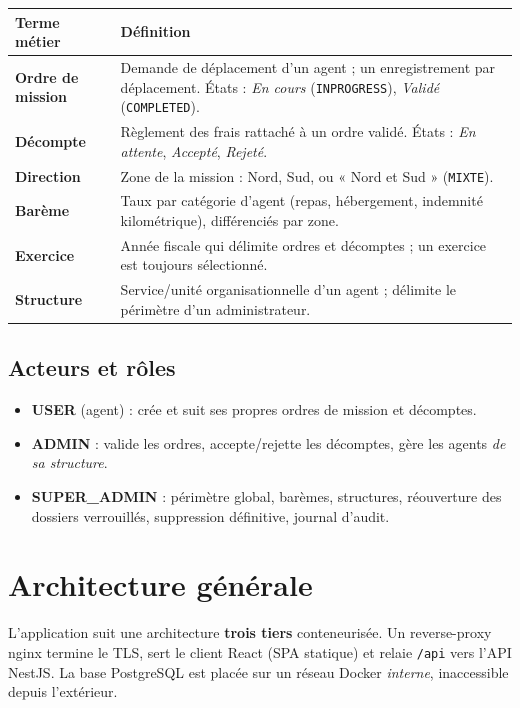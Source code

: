 \documentclass[10.5pt,a4paper]{article}
\newcommand{\code}[1]{\texttt{\small #1}}
\begin{document}
\begin{tabularx}{\textwidth}{@{}>{\bfseries}l X@{}}
\toprule
Terme métier & Définition \\
\midrule
Ordre de mission & Demande de déplacement d'un agent ; un enregistrement par déplacement. États : \emph{En cours} (\code{INPROGRESS}), \emph{Validé} (\code{COMPLETED}). \\
Décompte & Règlement des frais rattaché à un ordre validé. États : \emph{En attente}, \emph{Accepté}, \emph{Rejeté}. \\
Direction & Zone de la mission : Nord, Sud, ou « Nord et Sud » (\code{MIXTE}). \\
Barème & Taux par catégorie d'agent (repas, hébergement, indemnité kilométrique), différenciés par zone. \\
Exercice & Année fiscale qui délimite ordres et décomptes ; un exercice est toujours sélectionné. \\
Structure & Service/unité organisationnelle d'un agent ; délimite le périmètre d'un administrateur. \\
\bottomrule
\end{tabularx}

\subsection*{Acteurs et rôles}
\begin{itemize}
  \item \textbf{USER} (agent) : crée et suit ses propres ordres de mission et décomptes.
  \item \textbf{ADMIN} : valide les ordres, accepte/rejette les décomptes, gère les agents \emph{de sa structure}.
  \item \textbf{SUPER\_ADMIN} : périmètre global, barèmes, structures, réouverture des dossiers verrouillés, suppression définitive, journal d'audit.
\end{itemize}

\section{Architecture générale}

L'application suit une architecture \textbf{trois tiers} conteneurisée. Un reverse-proxy nginx
termine le TLS, sert le client React (SPA statique) et relaie \code{/api} vers l'API NestJS.
La base PostgreSQL est placée sur un réseau Docker \emph{interne}, inaccessible depuis l'extérieur.
\end{document}
